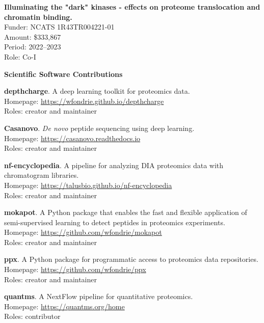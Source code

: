 \documentclass[11pt]{article}
\newcommand{\mysection}[1]{\vspace{1ex} \textbf{\large \textsf{#1} \quad \hrulefill}}
\newcommand{\myref}[1]{\href{#1}{\url{#1}}}
\begin{document}
{{\begin{etaremune}
  \item \textbf{Illuminating the "dark" kinases - effects on proteome translocation and chromatin binding.} \\
  Funder: NCATS 1R43TR004221-01 \\
  Amount: \$333,867 \\
  Period: 2022--2023 \\
  Role: Co-I

\end{etaremune}

\mysection{Scientific Software Contributions}
\begin{etaremune}
  \item \textbf{depthcharge}. A deep learning toolkit for proteomics data. \\
  Homepage: \myref{https://wfondrie.github.io/depthcharge} \\
  Roles: creator and maintainer

  \item \textbf{Casanovo}. \textit{ De novo } peptide sequencing using deep learning. \\
  Homepage: \myref{https://casanovo.readthedocs.io} \\
  Roles: creator and maintainer

  \item \textbf{nf-encyclopedia}. A pipeline for analyzing DIA proteomics data with chromatogram libraries. \\
  Homepage: \myref{https://talusbio.github.io/nf-encyclopedia} \\
  Roles: creator and maintainer

  \item \textbf{mokapot}. A Python package that enables the fast and flexible
  application of semi-supervised learning to detect peptides in proteomics
  experiments. \\
  Homepage: \myref{https://github.com/wfondrie/mokapot} \\
  Roles: creator and maintainer

  \item \textbf{ppx}. A Python package for programmatic access to proteomics
  data repositories. \\
  Homepage: \myref{https://github.com/wfondrie/ppx} \\
  Roles: creator and maintainer

  \item \textbf{quantms}. A NextFlow pipeline for quantitative proteomics. \\
  Homepage: \myref{https://quantms.org/home} \\
  Roles: contributor


\end{etaremune}}}
\end{document}
